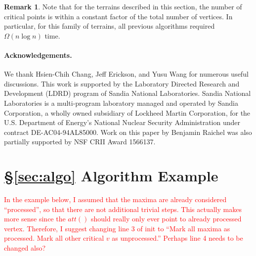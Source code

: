 \documentclass[11pt]{article}
\newcommand{\myparagraph}[1]{\paragraph{#1}}
\theoremstyle{definition}
\newtheorem{Remark}[theorem]{Remark}
\newcommand{\Sec}[1]{\hyperref[sec:#1]{\S\ref*{sec:#1}}} %
\begin{document}
\begin{Remark}
 Note that for the terrains described in this section, the number of critical points is within a constant factor of 
 the total number of vertices.  In particular, for this family of terrains, all previous algorithms required $\Omega(n\log n)$ time.
\end{Remark}





\myparagraph{Acknowledgements.}
We thank Hsien-Chih Chang, Jeff Erickson, and Yusu Wang for numerous useful discussions. This work is
supported by the Laboratory Directed Research and Development
(LDRD) program of Sandia National Laboratories. Sandia National
Laboratories is a multi-program laboratory managed and operated
by Sandia Corporation, a wholly owned subsidiary of Lockheed
Martin Corporation, for the U.S. Department of Energy's National
Nuclear Security Administration under contract DE-AC04-94AL85000.
Work on this paper by Benjamin Raichel was also partially supported
by NSF CRII Award 1566137.





\pagebreak
\appendix

\section{ \Sec{algo} Algorithm Example }

\textcolor{red}{
In the example below, I assumed that the maxima are already considered ``processed'', so that there are not additional trivial steps.  
This actually makes more sense since the $att()$ should really only ever point to already processed vertex.  Therefore, I suggest 
changing line 3 of init to ``Mark all maxima as processed.  Mark all other critical $v$ as unprocessed.''
Perhaps line 4 needs to be changed also?
}
\end{document}
